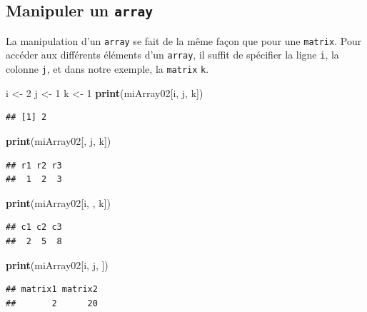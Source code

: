 \documentclass[twoside,symmetric]{book}
\newenvironment{Shaded}{}{}
\newcommand{\DecValTok}[1]{#1}
\newcommand{\KeywordTok}[1]{\textbf{#1}}
\newcommand{\NormalTok}[1]{#1}
\newcommand{\StringTok}[1]{#1}
\begin{document}
\hypertarget{manipuler-un-array}{%
\subsection{\texorpdfstring{Manipuler un \texttt{array}}{Manipuler un array}}\label{manipuler-un-array}}

La manipulation d'un \texttt{array} se fait de la même façon que pour une \texttt{matrix}. Pour accéder aux différents éléments d'un \texttt{array}, il suffit de spécifier la ligne \texttt{i}, la colonne \texttt{j}, et dans notre exemple, la \texttt{matrix} \texttt{k}.

\begin{Shaded}
\begin{Highlighting}[]
\NormalTok{i <-}\StringTok{ }\DecValTok{2}
\NormalTok{j <-}\StringTok{ }\DecValTok{1}
\NormalTok{k <-}\StringTok{ }\DecValTok{1}
\KeywordTok{print}\NormalTok{(miArray02[i, j, k])}
\end{Highlighting}
\end{Shaded}

\begin{verbatim}
## [1] 2
\end{verbatim}

\begin{Shaded}
\begin{Highlighting}[]
\KeywordTok{print}\NormalTok{(miArray02[, j, k])}
\end{Highlighting}
\end{Shaded}

\begin{verbatim}
## r1 r2 r3 
##  1  2  3
\end{verbatim}

\begin{Shaded}
\begin{Highlighting}[]
\KeywordTok{print}\NormalTok{(miArray02[i, , k])}
\end{Highlighting}
\end{Shaded}

\begin{verbatim}
## c1 c2 c3 
##  2  5  8
\end{verbatim}

\begin{Shaded}
\begin{Highlighting}[]
\KeywordTok{print}\NormalTok{(miArray02[i, j, ])}
\end{Highlighting}
\end{Shaded}

\begin{verbatim}
## matrix1 matrix2 
##       2      20
\end{verbatim}
\end{document}
